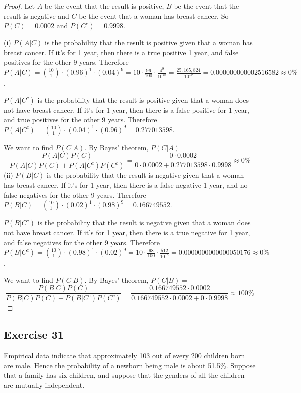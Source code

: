 \documentclass[14pt]{extarticle}
\begin{document}
\begin{proof}
Let \(A\) be the event that the result is positive, \(B\) be the event that the result is negative and \(C\) be the event 
that a woman has breast cancer. So \(P(C) = 0.0002\) and \(P(C^c) = 0.9998\).

(i) \(P(A|C)\) is the probability that the result is positive given that a woman has breast cancer. If it's for 1 year, then 
there is a true positive 1 year, and false positives for the other 9 years. Therefore \(P(A|C) = \binom{10}{1} \cdot 
(0.96)^1 \cdot (0.04)^9 = 10 \cdot \frac{96}{100} \cdot \frac{4^9}{10^{18}} = \frac{25,165,824}{10^{19}} = 
0.000000000002516582 \approx 0\%\).

\(P(A|C^c)\) is the probability that the result is positive given that a woman does not have breast cancer. If it's for 1 
year, then there is a false positive for 1 year, and true positives for the other 9 years. Therefore \(P(A|C^c) = 
\binom{10}{1} \cdot (0.04)^1 \cdot (0.96)^9 = 0.277013598\).

We want to find \(P(C|A)\). By Bayes' theorem, \(P(C|A) =\)
\[
\frac{P(A|C)P(C)}{P(A|C)P(C) + P(A|C^c)P(C^c)} = \frac{0 \cdot 0.0002}{0 \cdot 0.0002 + 0.277013598 \cdot 0.9998} \approx 0\%
\]
(ii) \(P(B|C)\) is the probability that the result is negative given that a woman has breast cancer. If it's for 1 year, then 
there is a false negative 1 year, and no false negatives for the other 9 years. Therefore \(P(B|C) = \binom{10}{1} \cdot 
(0.02)^1 \cdot (0.98)^9 = 0.166749552\).

\(P(B|C^c)\) is the probability that the result is negative given that a woman does not have breast cancer. If it's for 1 
year, then there is a true negative for 1 year, and false negatives for the other 9 years. Therefore \(P(B|C^c) = 
\binom{10}{1} \cdot (0.98)^1 \cdot (0.02)^9 = 10 \cdot \frac{98}{100} \cdot \frac{512}{10^{18}} = 
0.0000000000000050176 \approx 0\%\).

We want to find \(P(C|B)\). By Bayes' theorem, \(P(C|B) =\)
\[
\frac{P(B|C)P(C)}{P(B|C)P(C) + P(B|C^c)P(C^c)} = \frac{0.166749552 \cdot 0.0002}{0.166749552 \cdot 0.0002 + 0 
\cdot 0.9998} \approx 100\%
\]
\end{proof}

\subsection{Exercise 31}
Empirical data indicate that approximately 103 out of every 200 children born are male. Hence the probability of a newborn 
being male is about 51.5\%. Suppose that a family has six children, and suppose that the genders of all the children are
mutually independent.
\end{document}
